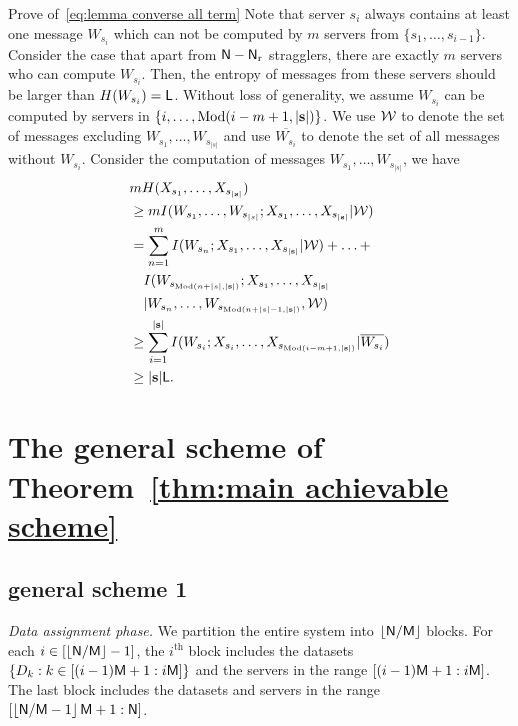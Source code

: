 \documentclass[conference,letterpaper]{IEEEtran}
\begin{document}
Prove of~\eqref{eq:lemma converse all term} Note that server $s_i$ always contains at least one message $W_{s_i}$ which can not be computed by $m$ servers from $\{s_1, \ldots, s_{i-1}\}$. Consider the case that apart from ${\sf N} - {\sf N}_{\rm r}$ stragglers, there are exactly $m$ servers who can compute $W_{s_i}$. Then,  the entropy of messages from these servers should be larger than $H(W_{s_i}) = {\sf L}$. Without loss of generality, we assume $W_{s_i}$ can be computed by servers in $\{i,\ldots,\text{Mod}(i-m+1,|{\bf s}|)\}$. We use \({\cal W}\) to denote the set of messages excluding \(W_{s_1}, \ldots, W_{s_{|s|}}\) and use $\overline{W_{s_i}}$ to denote the set of all messages without $W_{s_i}$.
Consider the computation of messages $W_{s_1}, \ldots, W_{s_{|s|}}$, we have 
\begin{subequations}
\begin{align}
    &  mH(X_{s_1}, \ldots, X_{s_{|{\bf s}|}}) \\
    & \geq m I(W_{s_1}, \ldots, W_{s_{|s|}};X_{s_1}, \ldots, X_{s_{|{\bf s}|}} | {\cal W}) \\
    & = \sum_{n = 1}^{m} I(W_{s_n};X_{s_1}, \ldots, X_{s_{|{\bf s}|}}| {\cal W}) + \ldots + \nonumber \\
     & \quad  I(W_{s_{\text{Mod} (n+|s|,|{\bf s}|)}};X_{s_1}, \ldots, X_{s_{|{\bf s}|}} \nonumber\\ & \quad | W_{s_n}, \ldots, W_{s_{\text{Mod}(n+|s|-1,|{\bf s}|)}} , {\cal W}) \\
     & \geq \sum_{ i = 1}^{|{\bf s}|} I(W_{s_i} ; X_{s_i},\ldots, X_{s_{\text{Mod}(i-m+1,|{\bf s}|)}} | \overline{W_{s_{i}}} ) \\
     & \geq   |{\bf s}| {\sf L}.
\end{align}
\end{subequations}


\section{The general scheme of Theorem~\ref{thm:main achievable scheme}}
\label{sec:general scheme} 
\subsection{general scheme 1}
\label{general scheme 1}
{\it Data assignment phase.}
We partition the entire system into $\left\lfloor  {\sf N}/{\sf M} \right\rfloor $ blocks. For each $i \in [\left\lfloor {\sf N}/{\sf M} \right\rfloor - 1]$, the $i^{\text{th}}$ block includes the datasets $\{ D_{k}: k \in \left[(i-1){\sf M}+1: i{\sf M} \right]\}$ and the servers in the range $\left[(i-1){\sf M}+1: i{\sf M} \right]$.
The last block includes the datasets and servers in the range $\left[\left\lfloor {\sf N}/{\sf M} - 1 \right\rfloor {\sf M} + 1 : {\sf N} \right]$.
\end{document}
